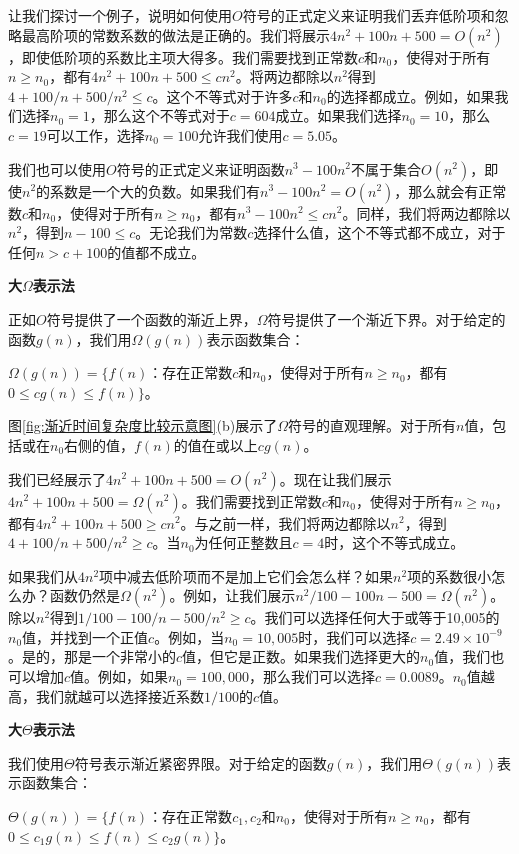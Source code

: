 \documentclass[lang=cn,newtx,10pt,scheme=chinese]{elegantbook}
\begin{document}
让我们探讨一个例子，说明如何使用$O$符号的正式定义来证明我们丢弃低阶项和忽略最高阶项的常数系数的做法是正确的。我们将展示$4 n^2+100 n+500=O(n^2)$，即使低阶项的系数比主项大得多。我们需要找到正常数$c$和$n_0$，使得对于所有$n \geq n_0$，都有$4 n^2+100 n+500 \leq c n^2$。将两边都除以$n^2$得到$4+100 / n+500 / n^2 \leq c$。这个不等式对于许多$c$和$n_0$的选择都成立。例如，如果我们选择$n_0=1$，那么这个不等式对于$c=604$成立。如果我们选择$n_0=10$，那么$c=19$可以工作，选择$n_0=100$允许我们使用$c=5.05$。

我们也可以使用$O$符号的正式定义来证明函数$n^3-100 n^2$不属于集合$O(n^2)$，即使$n^2$的系数是一个大的负数。如果我们有$n^3-100 n^2=O(n^2)$，那么就会有正常数$c$和$n_0$，使得对于所有$n \geq n_0$，都有$n^3-100 n^2 \leq c n^2$。同样，我们将两边都除以$n^2$，得到$n-100 \leq c$。无论我们为常数$c$选择什么值，这个不等式都不成立，对于任何$n>c+100$的值都不成立。

\textbf{大$\Omega$表示法}

正如$O$符号提供了一个函数的渐近上界，$\Omega$符号提供了一个渐近下界。对于给定的函数$g(n)$，我们用$\Omega(g(n))$表示函数集合：

$\Omega(g(n))=\{f(n)$：存在正常数$c$和$n_0$，使得对于所有$n \geq n_0$，都有$0 \leq c g(n) \leq f(n)\}$。

图\ref{fig:渐近时间复杂度比较示意图}(b)展示了$\Omega$符号的直观理解。对于所有$n$值，包括或在$n_0$右侧的值，$f(n)$的值在或以上$c g(n)$。

我们已经展示了$4n^2+100n+500=O(n^2)$。现在让我们展示$4n^2+100n+500=\Omega(n^2)$。我们需要找到正常数$c$和$n_0$，使得对于所有$n \geq n_0$，都有$4 n^2+100 n+500 \geq c n^2$。与之前一样，我们将两边都除以$n^2$，得到$4+100 / n+500 / n^2 \geq c$。当$n_0$为任何正整数且$c=4$时，这个不等式成立。

如果我们从$4n^2$项中减去低阶项而不是加上它们会怎么样？如果$n^2$项的系数很小怎么办？函数仍然是$\Omega(n^2)$。例如，让我们展示$n^2 / 100-100 n-500=\Omega(n^2)$。除以$n^2$得到$1 / 100-100 / n-500 / n^2 \geq c$。我们可以选择任何大于或等于10,005的$n_0$值，并找到一个正值$c$。例如，当$n_0=10,005$时，我们可以选择$c=2.49 \times 10^{-9}$。是的，那是一个非常小的$c$值，但它是正数。如果我们选择更大的$n_0$值，我们也可以增加$c$值。例如，如果$n_0=100,000$，那么我们可以选择$c=0.0089$。$n_0$值越高，我们就越可以选择接近系数$1 / 100$的$c$值。

\textbf{大$\Theta$表示法}

我们使用$\Theta$符号表示渐近紧密界限。对于给定的函数$g(n)$，我们用$\Theta(g(n))$表示函数集合：

$\Theta(g(n))=\{f(n)$：存在正常数$c_1, c_2$和$n_0$，使得对于所有$n \geq n_0$，都有$0 \leq c_1 g(n) \leq f(n) \leq c_2 g(n)\}$。
\end{document}

